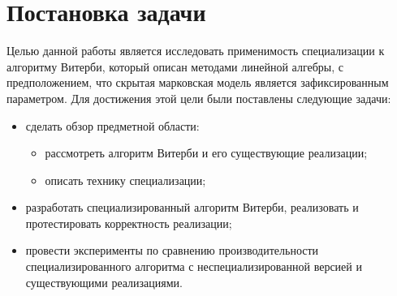 \section{Постановка задачи}
Целью данной работы является исследовать применимость специализации к алгоритму Витерби, который описан методами линейной алгебры, с предположением, что скрытая марковская модель является зафиксированным параметром. 
Для достижения этой цели были поставлены следующие задачи:
\begin{itemize}
	\item сделать обзор предметной области:
		\begin{itemize}
			\item рассмотреть алгоритм Витерби и его существующие реализации;
			\item описать технику специализации;
		\end{itemize}
	\item разработать специализированный алгоритм Витерби, реализовать и протестировать корректность реализации;
	\item провести эксперименты по сравнению производительности специализированного алгоритма с неспециализированной версией и существующими реализациями.
\end{itemize}

